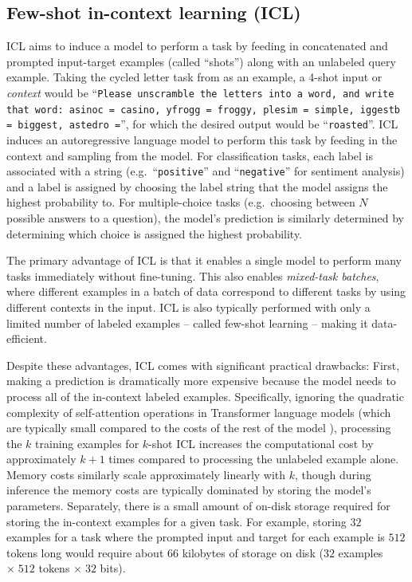 \subsection{Few-shot in-context learning (ICL)}
\label{sec:icl}

ICL \citep{radford2019language,brown2020language} aims to induce a model to perform a task by feeding in concatenated and prompted input-target examples (called ``shots'') along with an unlabeled query example. Taking the cycled letter task from \citet{brown2020language} as an example, a 4-shot input or \textit{context} would be ``\texttt{Please unscramble the letters into a word, and write that word: asinoc = casino, yfrogg = froggy, plesim = simple, iggestb = biggest, astedro =}'', for which the desired output would be ``\texttt{roasted}''.
ICL induces an autoregressive language model to perform this task by feeding in the context and sampling from the model. For classification tasks, each label is associated with a string (e.g.\ ``\texttt{positive}'' and ``\texttt{negative}'' for sentiment analysis) and a label is assigned by choosing the label string that the model assigns the highest probability to. For multiple-choice tasks (e.g.\ choosing between $N$ possible answers to a question), the model's prediction is similarly determined by determining which choice is assigned the highest probability.

The primary advantage of ICL is that it enables a single model to perform many tasks immediately without fine-tuning. This also enables \textit{mixed-task batches}, where different examples in a batch of data correspond to different tasks by using different contexts in the input. ICL is also typically performed with only a limited number of labeled examples -- called few-shot learning -- making it data-efficient.

Despite these advantages, ICL comes with significant practical drawbacks: First, making a prediction is dramatically more expensive because the model needs to process all of the in-context labeled examples. Specifically, ignoring the quadratic complexity of self-attention operations in Transformer language models (which are typically small compared to the costs of the rest of the model \citep{kaplan2020scaling}), processing the $k$ training examples for $k$-shot ICL increases the computational cost by approximately $k + 1$ times compared to processing the unlabeled example alone. Memory costs similarly scale approximately linearly with $k$, though during inference the memory costs are typically dominated by storing the model's parameters. Separately, there is a small amount of on-disk storage required for storing the in-context examples for a given task. For example, storing $32$ examples for a task where the prompted input and target for each example is $512$ tokens long would require about $66$ kilobytes of storage on disk ($32$ examples $\times\;512$ tokens $\times\;32$ bits).

